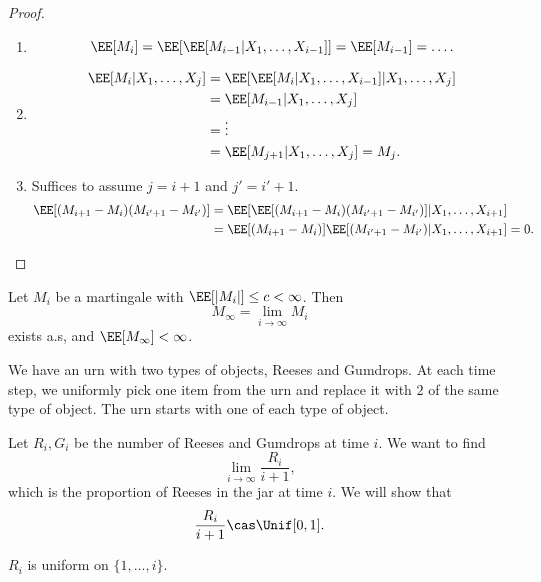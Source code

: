 \begin{proof}
\begin{enumerate}
	\item 
		\[\EE[M_i] = \EE[\EE[M_{i-1} | X_1, \hdots, X_{i-1}]] = \EE[M_{i-1}] = \hdots. \]
	\item 
		\begin{align*}
			\EE[M_i|X_1, \hdots, X_j] &= \EE[\EE[M_i|X_1, \hdots, X_{i-1}]|X_1, \hdots, X_j] \\
																&= \EE[M_{i-1}|X_1, \hdots, X_j] \\
																&= \vdots \\
																&= \EE[M_{j+1} | X_1, \hdots, X_j] = M_j. 
		\end{align*}	
	\item Suffices to assume $j=i+1$ and $j' = i'+1$. 
		\begin{align*}
			\EE[(M_{i+1}-M_i)(M_{i'+1}-M_{i'})] &= \EE[\EE[(M_{i+1}-M_i)(M_{i'+1}-M_{i'})]|X_1, \hdots, X_{i+1}] \\
																					&= \EE[(M_{i+1}-M_i)]\EE[(M_{i'+1}-M_{i'}) | X_1, \hdots, X_{i+1}] = 0. 
		\end{align*}
\end{enumerate}
\end{proof}


\begin{theorem}

Let $M_i$ be a martingale with $\EE[\vert M_i\vert] \leq c < \infty$. Then 
\[M_{\infty} = \lim_{i\rightarrow \infty}M_i\]
exists a.s, and $\EE[M_{\infty}] < \infty$.  
\end{theorem}

\begin{example}

We have an urn with two types of objects, Reeses and Gumdrops. At each time step, we uniformly pick one item from the urn and replace it with $2$ of the same type of object. The urn starts with one of each type of object. 
\end{example}

Let $R_i,G_i$ be the number of Reeses and Gumdrops at time $i$. We want to find 
\[\lim_{i\rightarrow \infty}\frac{R_{i}}{i+1},\] 
which is the proportion of Reeses in the jar at time $i$. We will show that 
\[\frac{R_i}{i+1}\cas \Unif[0,1].\] 

\begin{theorem}
\claimlabel

$R_i$ is uniform on $\{1,\hdots, i\}$. 
\end{theorem}

